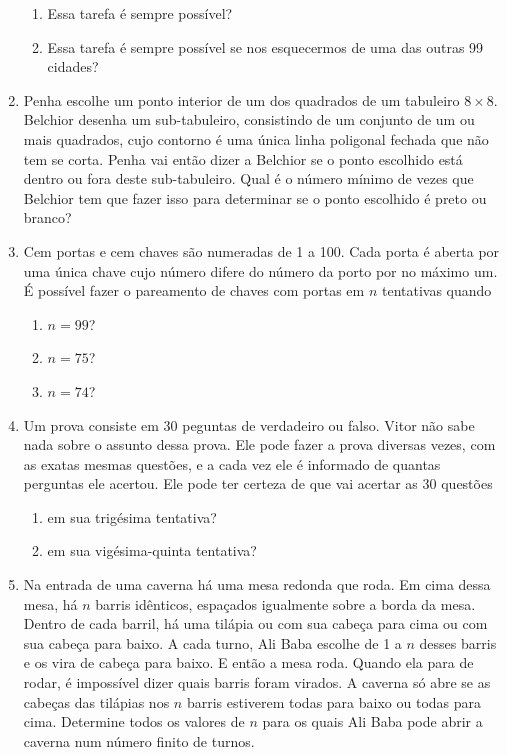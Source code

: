 \documentclass{article}
\begin{document}
\begin{enumerate}
    \begin{enumerate}
    \item Essa tarefa é sempre possível?
    
    \item Essa tarefa é sempre possível se nos esquecermos de uma das outras 99 cidades?
    \end{enumerate}
    
    \item Penha escolhe um ponto interior de um dos quadrados de um tabuleiro $8\times 8$. Belchior desenha um sub-tabuleiro, consistindo de um conjunto de um ou mais quadrados, cujo contorno é uma única linha poligonal fechada que não tem se corta. Penha vai então dizer a Belchior se o ponto escolhido está dentro ou fora deste sub-tabuleiro. Qual é o número mínimo de vezes que Belchior tem que fazer isso para determinar se o ponto escolhido é preto ou branco?
    
    \item Cem portas e cem chaves são numeradas de 1 a 100. Cada porta é aberta por uma única chave cujo número difere do número da porto por no máximo um. É possível fazer o pareamento de chaves com portas em $n$ tentativas quando
    
    \begin{enumerate}
    \item $n=99$?
    
    \item $n=75$?
    
    \item $n=74$?
    \end{enumerate}
    
    \item Um prova consiste em 30 peguntas de verdadeiro ou falso. Vitor não sabe nada sobre o assunto dessa prova. Ele pode fazer a prova diversas vezes, com as exatas mesmas questões, e a cada vez ele é informado de quantas perguntas ele acertou. Ele pode ter certeza de que vai acertar as 30 questões
    
    \begin{enumerate}
    \item em sua trigésima tentativa?
    
    \item em sua vigésima-quinta tentativa?
    \end{enumerate}
    
    \item Na entrada de uma caverna há uma mesa redonda que roda. Em cima dessa mesa, há $n$ barris idênticos, espaçados igualmente sobre a borda da mesa. Dentro de cada barril, há uma tilápia ou com sua cabeça para cima ou com sua cabeça para baixo. A cada turno, Ali Baba escolhe de 1 a $n$ desses barris e os vira de cabeça para baixo. E então a mesa roda. Quando ela para de rodar, é impossível dizer quais barris foram virados. A caverna só abre se as cabeças das tilápias nos $n$ barris estiverem todas para baixo ou todas para cima. Determine todos os valores de $n$ para os quais Ali Baba pode abrir a caverna num número finito de turnos.
\end{enumerate}
\end{document}
